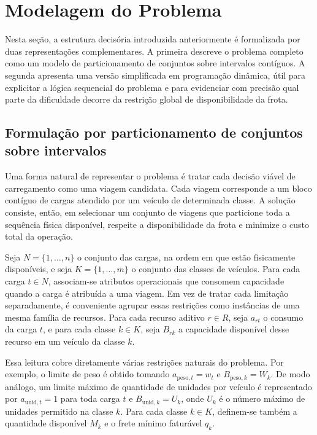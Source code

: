 \section{Modelagem do Problema}

Nesta seção, a estrutura decisória introduzida anteriormente é formalizada por
duas representações complementares. A primeira descreve o problema completo
como um modelo de particionamento de conjuntos sobre intervalos contíguos. A
segunda apresenta uma versão simplificada em programação dinâmica, útil para
explicitar a lógica sequencial do problema e para evidenciar com precisão qual
parte da dificuldade decorre da restrição global de disponibilidade da frota.

\subsection{Formulação por particionamento de conjuntos sobre intervalos}

Uma forma natural de representar o problema é tratar cada decisão viável de
carregamento como uma viagem candidata. Cada viagem corresponde a um bloco
contíguo de cargas atendido por um veículo de determinada classe. A solução
consiste, então, em selecionar um conjunto de viagens que particione toda a
sequência física disponível, respeite a disponibilidade da frota e minimize o
custo total da operação.

Seja \(N = \{1,\dots,n\}\) o conjunto das cargas, na ordem em que estão
fisicamente disponíveis, e seja \(K = \{1,\dots,m\}\) o conjunto das classes de
veículos. Para cada carga \(t \in N\), associam-se atributos operacionais que
consomem capacidade quando a carga é atribuída a uma viagem. Em vez de tratar
cada limitação separadamente, é conveniente agrupar essas restrições como
instâncias de uma mesma família de recursos. Para cada recurso aditivo
\(r \in R\), seja \(a_{rt}\) o consumo da carga \(t\), e para cada classe
\(k \in K\), seja \(B_{rk}\) a capacidade disponível desse recurso em um
veículo da classe \(k\).

Essa leitura cobre diretamente várias restrições naturais do problema. Por
exemplo, o limite de peso é obtido tomando \(a_{\text{peso},t} = w_t\) e
\(B_{\text{peso},k} = W_k\). De modo análogo, um limite máximo de quantidade de
unidades por veículo é representado por \(a_{\text{unid},t} = 1\) para toda
carga \(t\) e \(B_{\text{unid},k} = U_k\), onde \(U_k\) é o número máximo de
unidades permitido na classe \(k\). Para cada classe \(k \in K\), definem-se
também a quantidade disponível \(M_k\) e o frete mínimo faturável \(q_k\).

